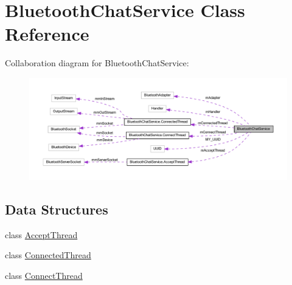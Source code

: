 \hypertarget{classcom_1_1example_1_1android_1_1_bluetooth_chat_1_1_bluetooth_chat_service}{\section{Bluetooth\-Chat\-Service Class Reference}
\label{classcom_1_1example_1_1android_1_1_bluetooth_chat_1_1_bluetooth_chat_service}
}


Collaboration diagram for Bluetooth\-Chat\-Service\-:\nopagebreak
\begin{figure}[H]
\begin{center}
\leavevmode
\includegraphics[width=350pt]{classcom_1_1example_1_1android_1_1_bluetooth_chat_1_1_bluetooth_chat_service__coll__graph}
\end{center}
\end{figure}
\subsection*{Data Structures}
\begin{DoxyCompactItemize}
\item 
class \hyperlink{classcom_1_1example_1_1android_1_1_bluetooth_chat_1_1_bluetooth_chat_service_1_1_accept_thread}{Accept\-Thread}
\item 
class \hyperlink{classcom_1_1example_1_1android_1_1_bluetooth_chat_1_1_bluetooth_chat_service_1_1_connected_thread}{Connected\-Thread}
\item 
class \hyperlink{classcom_1_1example_1_1android_1_1_bluetooth_chat_1_1_bluetooth_chat_service_1_1_connect_thread}{Connect\-Thread}
\end{DoxyCompactItemize}
